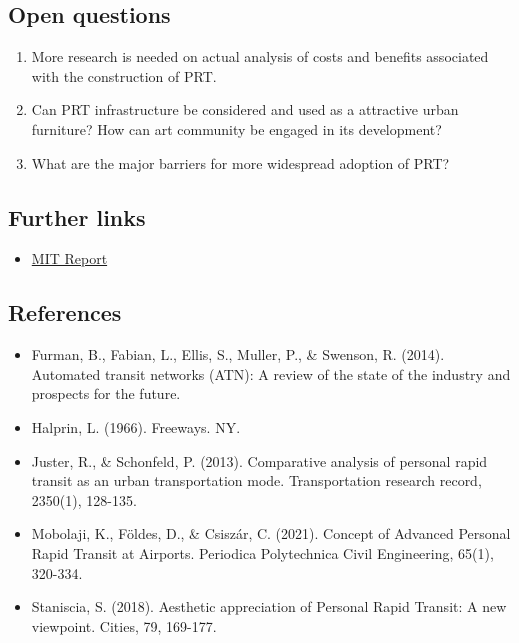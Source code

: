 \documentclass[
]{book}
\providecommand{\tightlist}{%
  \setlength{\itemsep}{0pt}\setlength{\parskip}{0pt}}
\begin{document}
\hypertarget{open-questions-18}{%
\subsection*{Open questions}\label{open-questions-18}}

\begin{enumerate}
\def\labelenumi{\arabic{enumi}.}
\tightlist
\item
  More research is needed on actual analysis of costs and benefits associated with the construction of PRT.
\item
  Can PRT infrastructure be considered and used as a attractive urban furniture? How can art community be engaged in its development?
\item
  What are the major barriers for more widespread adoption of PRT?
\end{enumerate}

\hypertarget{further-links-15}{%
\subsection*{Further links}\label{further-links-15}}

\begin{itemize}
\tightlist
\item
  \href{https://transweb.sjsu.edu/sites/default/files/1227-automated-transit-networks.pdf}{MIT Report}
\end{itemize}

\hypertarget{references-18}{%
\subsection*{References}\label{references-18}}

\begin{itemize}
\tightlist
\item
  Furman, B., Fabian, L., Ellis, S., Muller, P., \& Swenson, R. (2014). Automated transit networks (ATN): A review of the state of the industry and prospects for the future.
\item
  Halprin, L. (1966). Freeways. NY.
\item
  Juster, R., \& Schonfeld, P. (2013). Comparative analysis of personal rapid transit as an urban transportation mode. Transportation research record, 2350(1), 128-135.
\item
  Mobolaji, K., Földes, D., \& Csiszár, C. (2021). Concept of Advanced Personal Rapid Transit at Airports. Periodica Polytechnica Civil Engineering, 65(1), 320-334.
\item
  Staniscia, S. (2018). Aesthetic appreciation of Personal Rapid Transit: A new viewpoint. Cities, 79, 169-177.
\end{itemize}
\end{document}

